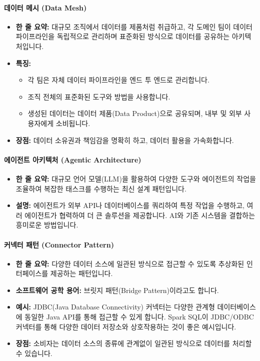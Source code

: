 \documentclass[11pt,a4paper]{article}
\theoremstyle{definition}
\begin{document}
\paragraph{데이터 메시 (Data Mesh)}
\begin{itemize}
    \item \textbf{한 줄 요약:} 대규모 조직에서 데이터를 제품처럼 취급하고, 각 도메인 팀이 데이터 파이프라인을 독립적으로 관리하며 표준화된 방식으로 데이터를 공유하는 아키텍처입니다.
    \item \textbf{특징:}
    \begin{itemize}
        \item 각 팀은 자체 데이터 파이프라인을 엔드 투 엔드로 관리합니다.
        \item 조직 전체의 표준화된 도구와 방법을 사용합니다.
        \item 생성된 데이터는 데이터 제품(Data Product)으로 공유되며, 내부 및 외부 사용자에게 소비됩니다.
    \end{itemize}
    \item \textbf{장점:} 데이터 소유권과 책임감을 명확히 하고, 데이터 활용을 가속화합니다.
\end{itemize}

\paragraph{에이전트 아키텍처 (Agentic Architecture)}
\begin{itemize}
    \item \textbf{한 줄 요약:} 대규모 언어 모델(LLM)을 활용하여 다양한 도구와 에이전트의 작업을 조율하여 복잡한 태스크를 수행하는 최신 설계 패턴입니다.
    \item \textbf{설명:} 에이전트가 외부 API나 데이터베이스를 쿼리하여 특정 작업을 수행하고, 여러 에이전트가 협력하여 더 큰 솔루션을 제공합니다. AI와 기존 시스템을 결합하는 흥미로운 방법입니다.
\end{itemize}

\paragraph{커넥터 패턴 (Connector Pattern)}
\begin{itemize}
    \item \textbf{한 줄 요약:} 다양한 데이터 소스에 일관된 방식으로 접근할 수 있도록 추상화된 인터페이스를 제공하는 패턴입니다.
    \item \textbf{소프트웨어 공학 용어:} 브릿지 패턴(Bridge Pattern)이라고도 합니다.
    \item \textbf{예시:} JDBC(Java Database Connectivity) 커넥터는 다양한 관계형 데이터베이스에 동일한 Java API를 통해 접근할 수 있게 합니다. Spark SQL이 JDBC/ODBC 커넥터를 통해 다양한 데이터 저장소와 상호작용하는 것이 좋은 예시입니다.
    \item \textbf{장점:} 소비자는 데이터 소스의 종류에 관계없이 일관된 방식으로 데이터를 처리할 수 있습니다.
\end{itemize}
\end{document}
